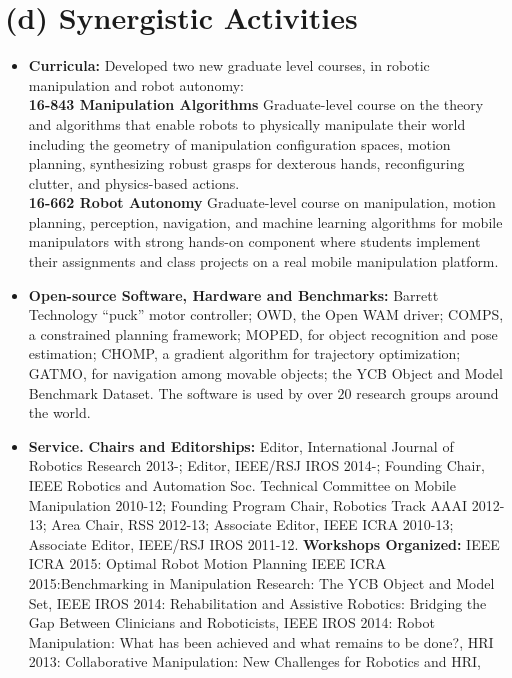 \documentclass[10pt]{article}
\begin{document}
\section{(d) Synergistic Activities}
\begin{itemize}
\addtolength{\itemsep}{-0.5\baselineskip}
\item \textbf{Curricula:} Developed two new graduate level courses, in robotic manipulation and robot autonomy: \\
\textbf{16-843 Manipulation Algorithms} Graduate-level course on the theory and algorithms that enable robots to physically manipulate their world including the geometry of manipulation configuration spaces, motion planning, synthesizing robust grasps for dexterous hands, reconfiguring clutter, and physics-based actions.\\
\textbf{16-662 Robot Autonomy}
Graduate-level course on manipulation, motion planning, perception, navigation,
and machine learning algorithms for mobile manipulators with strong hands-on component where students implement their assignments and class projects on a real mobile manipulation platform.
\item \textbf{Open-source Software, Hardware and Benchmarks:}
Barrett Technology ``puck'' motor controller; OWD, the Open WAM driver; COMPS, a constrained planning framework; MOPED, for object recognition and pose estimation; CHOMP, a gradient algorithm for trajectory optimization; GATMO, for navigation among movable objects; the YCB Object and Model Benchmark Dataset. The software is used by over $20$ research groups around the world. 
\item \textbf{Service.} \textbf{Chairs and Editorships:}
Editor, International Journal of Robotics Research 2013-;
Editor, IEEE/RSJ IROS 2014-;
Founding Chair, IEEE Robotics and Automation Soc. Technical Committee on Mobile Manipulation 2010-12;
Founding Program Chair, Robotics Track AAAI 2012-13;
Area Chair, RSS 2012-13;
Associate Editor, IEEE ICRA 2010-13;
Associate Editor, IEEE/RSJ IROS 2011-12.
\textbf{Workshops Organized:} 
IEEE ICRA 2015: Optimal Robot Motion Planning
IEEE ICRA 2015:Benchmarking in Manipulation Research: The YCB Object and Model Set,
IEEE IROS 2014: Rehabilitation and Assistive Robotics: Bridging the Gap Between Clinicians and Roboticists,
IEEE IROS 2014: Robot Manipulation: What has been achieved and what remains to be done?,
HRI 2013: Collaborative Manipulation: New Challenges for Robotics and HRI,

\end{itemize}
\end{document}
